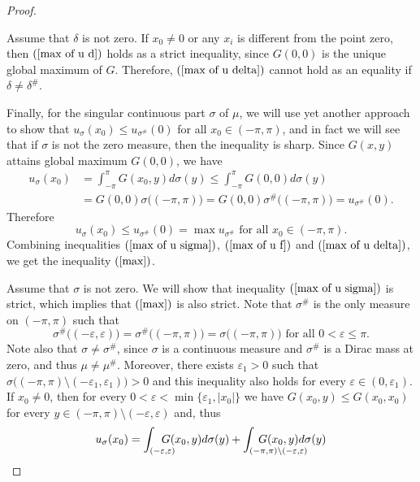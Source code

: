 \documentclass[11pt]{amsart}
\numberwithin{equation}{section}
\begin{document}
\begin{proof}
\begin{equation}
\end{equation}
\par Assume that \(\delta\) is not zero. If \(x_0\neq0\) or any \(x_i\) is different from the point zero, then \((\ref{max of u d})\) holds as a strict inequality, since \(G(0,0)\) is the unique global maximum of \(G\). Therefore, \((\ref{max of u delta})\) cannot hold as an equality if \(\delta\neq\delta^\#\).
\par Finally, for the singular continuous part \(\sigma\) of \(\mu\), we will use yet another approach to show that \(u_\sigma(x_0)\leq u_{\sigma^\#}(0)\) for all \(x_0\in(-\pi,\pi)\), and in fact we will see that if \(\sigma\) is not the zero measure, then the inequality is sharp. Since \(G(x,y)\) attains global maximum \(G(0,0)\), we have 
\begin{align*}
u_\sigma(x_0)&=\int_{-\pi}^\pi G(x_0,y)d\sigma(y)\leq\int_{-\pi}^\pi G(0,0)d\sigma(y)\\
&=G(0,0)\sigma\bigl((-\pi,\pi)\bigr)=G(0,0)\sigma^\#\bigl((-\pi,\pi)\bigr)=u_{\sigma^\#}(0).
\end{align*}
Therefore
\begin{equation}\label{max of u sigma}
u_\sigma(x_0)\leq u_{\sigma^\#}(0)=\max u_{\sigma^\#}\text{ for all }x_0\in(-\pi,\pi).
\end{equation}
Combining inequalities \((\ref{max of u sigma})\), \((\ref{max of u f})\) and \((\ref{max of u delta})\), we get the inequality \((\ref{max})\).
\par  Assume that \(\sigma\) is not zero. We will show that inequality \((\ref{max of u sigma})\) is strict, which implies that \((\ref{max})\) is also strict. Note that \(\sigma^\#\) is the only measure on \((-\pi,\pi)\) such that \[\sigma^\#\bigl((-\varepsilon,\varepsilon)\bigr)=\sigma^\#\bigl((-\pi,\pi)\bigr)=\sigma\bigl((-\pi,\pi)\bigr)\text{ for all }0<\varepsilon\leq\pi.\]
Note also that \(\sigma\neq\sigma^\#\), since \(\sigma\) is a continuous measure and \(\sigma^\#\) is a Dirac mass at zero, and thus \(\mu\neq\mu^\#\). Moreover, there exists \(\varepsilon_1>0\) such that \(\sigma\bigl((-\pi,\pi)\setminus(-\varepsilon_1,\varepsilon_1)\bigr)>0\) and this inequality also holds for every \(\varepsilon\in(0,\varepsilon_1)\).\\
If \(x_0\neq0\), then for every \(0<\varepsilon<\min\{\varepsilon_1,|x_0|\}\) we have \(G(x_0,y)\leq G(x_0,x_0)\) for every \(y\in(-\pi,\pi)\setminus(-\varepsilon,\varepsilon)\) and, thus
\begin{align}
\nonumber u_\sigma(x_0)&=\int_{(-\varepsilon,\varepsilon)} \kern-0.5cm G(x_0,y)d\sigma(y)+\int_{(-\pi,\pi)\setminus(-\varepsilon,\varepsilon)}\kern-1.6cmG(x_0,y)d\sigma(y)\\

\end{align}
\end{proof}
\end{document}
